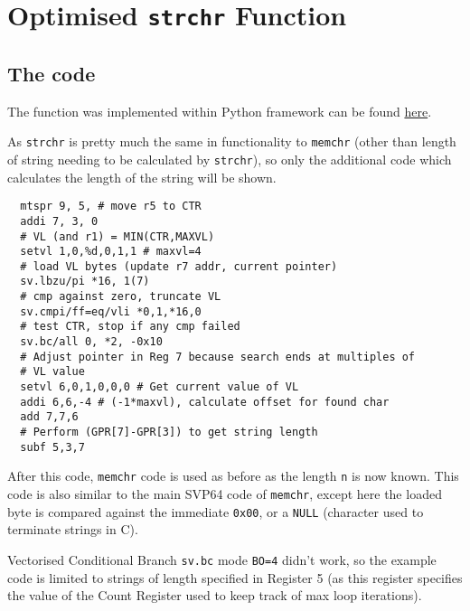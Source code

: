 %

\section{Optimised \texttt{strchr} Function}

\subsection{The code}

The function was implemented within Python framework can be found
\href{https://github.com/ngisearchsvp64/glibc-svp64/blob/master/svp64-port/experimentation/test_strchr.py}{here}.

As \texttt{strchr} is pretty much the same in functionality to \texttt{memchr}
(other than length of string needing to be calculated by \texttt{strchr}), so
only the additional code which calculates the length of the string will be shown.

\begin{verbatim}
  mtspr 9, 5, # move r5 to CTR
  addi 7, 3, 0
  # VL (and r1) = MIN(CTR,MAXVL)
  setvl 1,0,%d,0,1,1 # maxvl=4
  # load VL bytes (update r7 addr, current pointer)
  sv.lbzu/pi *16, 1(7)
  # cmp against zero, truncate VL
  sv.cmpi/ff=eq/vli *0,1,*16,0
  # test CTR, stop if any cmp failed
  sv.bc/all 0, *2, -0x10
  # Adjust pointer in Reg 7 because search ends at multiples of
  # VL value
  setvl 6,0,1,0,0,0 # Get current value of VL
  addi 6,6,-4 # (-1*maxvl), calculate offset for found char
  add 7,7,6
  # Perform (GPR[7]-GPR[3]) to get string length
  subf 5,3,7
\end{verbatim}

After this code, \texttt{memchr} code is used as before as the length
\texttt{n} is now known.
This code is also similar to the main SVP64 code of \texttt{memchr}, except here
the loaded byte is compared against the immediate \texttt{0x00},
or a \texttt{NULL} (character used to terminate strings in C).

Vectorised Conditional Branch \texttt{sv.bc} mode \texttt{BO=4} didn't work,
so the example code is limited to strings of length specified in Register 5
(as this register specifies the value of the Count Register used to keep track
of max loop iterations).
